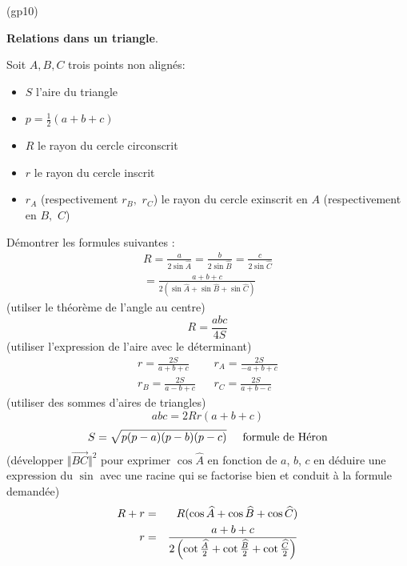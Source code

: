 \begin{tiny}(gp10)\end{tiny}
 \textbf{Relations dans un triangle}.

Soit $A,B,C$ trois points non align{\'e}s:
\begin{itemize}
\item  $S$ l'aire du triangle
\item  $p=\frac{1}{2}(a+b+c)$
\item  $R$ le rayon du cercle circonscrit
\item  $r$ le rayon du cercle inscrit
\item  $r_{A}$ (respectivement $r_{B},$ $r_{C}$) le rayon du cercle
exinscrit en $A$ (respectivement en $B,$ $C$)
\end{itemize}
D{\'e}montrer les formules suivantes :
\begin{multline*}
 R = \frac{a}{2\sin \widehat{A}}=\frac{b}{2\sin \widehat{B}} =\frac{c}{2\sin\widehat{C}} \\
=\frac{a+b+c}{2(\sin \widehat{A}+\sin \widehat{B}+\sin \widehat{C})}
\end{multline*}
(utilser le théorème de l'angle au centre)
\begin{displaymath}
R =\frac{abc}{4S} 
\end{displaymath}
(utiliser l'expression de l'aire avec le déterminant)
\begin{align*}
 r=\frac{2S}{a+b+c} & & r_{A} =\frac{2S}{-a+b+c}\\
r_{B} = \frac{2S}{a-b+c} & & r_{C} = \frac{2S}{a+b-c}
\end{align*}
(utiliser des sommes d'aires de triangles)
\begin{displaymath}
abc = 2Rr(a+b+c) 
\end{displaymath}
\begin{displaymath}
S = \sqrt{p(p-a)(p-b)(p-c)}\hspace{0.5cm}\text{formule de Héron} 
\end{displaymath}
(développer $\Vert \overrightarrow{BC}\Vert^2$ pour exprimer $\cos \widehat A$ en fonction de $a$, $b$, $c$ en déduire une expression du $\sin$ avec une racine qui se factorise bien et conduit à la formule demandée)
\begin{align*}
R+r &=&R(\cos \widehat{A}+\cos \widehat{B}+\cos \widehat{C}) \\
r &=&\frac{a+b+c}{2\left( \cot \frac{\widehat {A}}{2}+\cot \frac{%
\widehat {B}}{2}+\cot \frac{\widehat {C}}{2}\right) }
\end{align*}
